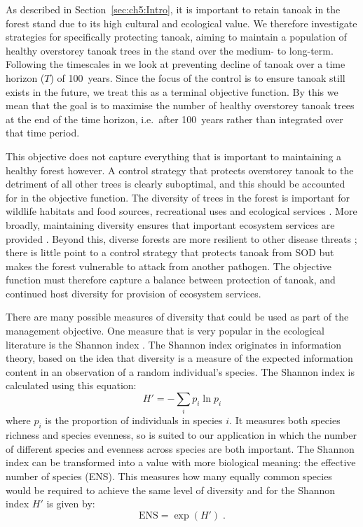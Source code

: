 As described in Section~\ref{sec:ch5:Intro}, it is important to retain tanoak in the forest stand due to its high cultural and ecological value. We therefore investigate strategies for specifically protecting tanoak, aiming to maintain a population of healthy overstorey tanoak trees in the stand over the medium- to long-term. Following the timescales in \citet{cobb_ecosystem_2012} we look at preventing decline of tanoak over a time horizon ($T$) of 100~years. Since the focus of the control is to ensure tanoak still exists in the future, we treat this as a terminal objective function. By this we mean that the goal is to maximise the number of healthy overstorey tanoak trees at the end of the time horizon, i.e.\ after 100~years rather than integrated over that time period.

This objective does not capture everything that is important to maintaining a healthy forest however. A control strategy that protects overstorey tanoak to the detriment of all other trees is clearly suboptimal, and this should be accounted for in the objective function. The diversity of trees in the forest is important for wildlife habitats and food sources, recreational uses and ecological services \citep{swiecki_reference_2013}. More broadly, maintaining diversity ensures that important ecosystem services are provided \citep{cadotte_beyond_2011, gamfeldt_higher_2013}. Beyond this, diverse forests are more resilient to other disease threats \citep{keesing_impacts_2010}; there is little point to a control strategy that protects tanoak from SOD but makes the forest vulnerable to attack from another pathogen. The objective function must therefore capture a balance between protection of tanoak, and continued host diversity for provision of ecosystem services.

There are many possible measures of diversity that could be used as part of the management objective. One measure that is very popular in the ecological literature is the Shannon index \citep[][pp.\ 106--108]{magurran_measuring_2013}. The Shannon index originates in information theory, based on the idea that diversity is a measure of the expected information content in an observation of a random individual's species. The Shannon index is calculated using this equation:
\begin{equation}\label{eqn:ch6:shannon_idx}
    H' = -\sum_ip_i\ln{p_i}
\end{equation}
where $p_i$ is the proportion of individuals in species $i$. It measures both species richness and species evenness, so is suited to our application in which the number of different species and evenness across species are both important. The Shannon index can be transformed into a value with more biological meaning: the effective number of species (ENS). This measures how many equally common species would be required to achieve the same level of diversity and for the Shannon index $H'$ is given by:
\begin{equation}\label{eqn:ch6:shannon_ens}
    \textrm{ENS} = \exp(H')\;.
\end{equation}

